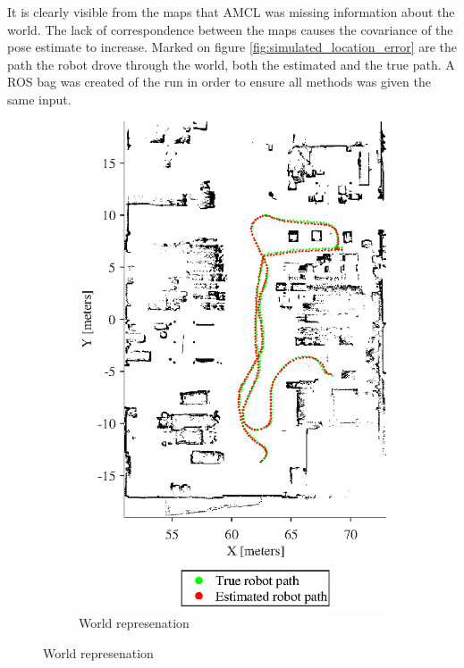 It is clearly visible from the maps that AMCL was missing information about the world. The lack of correspondence between the maps causes the covariance of the pose estimate to increase.
Marked on figure \ref{fig:simulated_location_error} are the path the robot drove through the world, both the estimated and the true path.
A ROS bag was created of the run in order to ensure all methods was given the same input. 

\begin{figure}[tbph]
	\centering
	\begin{subfigure}[t]{0.45\textwidth}
		\includegraphics[width=\textwidth]{figures/static_mapping/simulation_poses_stage_map}
		\caption{World represenation}

\end{subfigure}
\end{figure}
